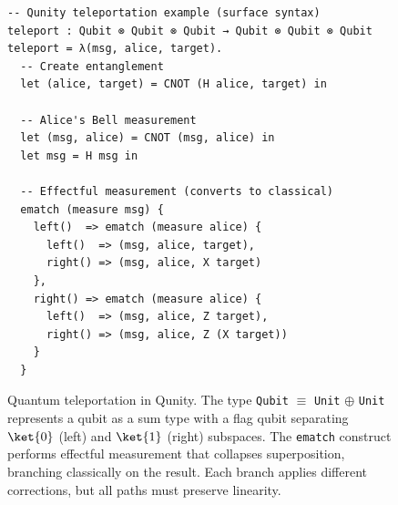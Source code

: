 \begin{figure}[t]
\begin{verbatim}
-- Qunity teleportation example (surface syntax)
teleport : Qubit ⊗ Qubit ⊗ Qubit → Qubit ⊗ Qubit ⊗ Qubit
teleport = λ(msg, alice, target).
  -- Create entanglement
  let (alice, target) = CNOT (H alice, target) in
  
  -- Alice's Bell measurement
  let (msg, alice) = CNOT (msg, alice) in
  let msg = H msg in
  
  -- Effectful measurement (converts to classical)
  ematch (measure msg) {
    left()  => ematch (measure alice) {
      left()  => (msg, alice, target),
      right() => (msg, alice, X target)
    },
    right() => ematch (measure alice) {
      left()  => (msg, alice, Z target),
      right() => (msg, alice, Z (X target))
    }
  }
\end{verbatim}
\caption{Quantum teleportation in Qunity. The type \texttt{Qubit} $\equiv$ \texttt{Unit} $\oplus$ \texttt{Unit} represents a qubit as a sum type with a flag qubit separating $\ket{0}$ (left) and $\ket{1}$ (right) subspaces. The \texttt{ematch} construct performs effectful measurement that collapses superposition, branching classically on the result. Each branch applies different corrections, but all paths must preserve linearity.}
\label{fig:qunity-teleport}
\end{figure}
